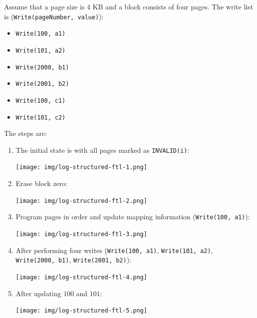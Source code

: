 \begin{examplebox}
    Assume that a page size is $4$ KB and a block consists of four pages. The write list is (\texttt{Write(pageNumber, value)}):
    \begin{itemize}
        \item \texttt{Write(100, a1)}
        \item \texttt{Write(101, a2)}
        \item \texttt{Write(2000, b1)}
        \item \texttt{Write(2001, b2)}
        \item \texttt{Write(100, c1)}
        \item \texttt{Write(101, c2)}
    \end{itemize}
    The steps are:
    \begin{enumerate}
        \item The initial state is with all pages marked as \texttt{INVALID(i)}:
        \begin{center}
            \texttt{[image: img/log-structured-ftl-1.png]}
        \end{center}

        \item Erase block zero:
        \begin{center}
            \texttt{[image: img/log-structured-ftl-2.png]}
        \end{center}

        \item Program pages in order and update mapping information (\texttt{Write(100, a1)}):
        \begin{center}
            \texttt{[image: img/log-structured-ftl-3.png]}
        \end{center}

        \item After performing four writes (\texttt{Write(100, a1)}, \texttt{Write(101, a2)}, \texttt{Write(2000, b1)}, \texttt{Write(2001, b2)}):
        \begin{center}
            \texttt{[image: img/log-structured-ftl-4.png]}
        \end{center}

        \item After updating $100$ and $101$:
        \begin{center}
            \texttt{[image: img/log-structured-ftl-5.png]}
        \end{center}
    \end{enumerate}
\end{examplebox}


